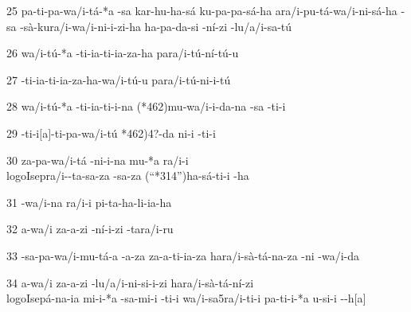 25 pa-ti-pa-wa/i-tá-*a  -sa kar-hu-ha-sá ku-pa-pa-sá-ha  a\logo{+}ra/i-pu-tá-wa/i-ni-sá-ha -sa -sà-ku\logo{+}ra/i-wa/i-ni-i-zi-ha ha\lbreak{}-pa-da-si -ní-zi \lmasc{}-lu/a/i-sa-tú

26 wa/i-tú-*a \lmasc{}-ti-ia-ti-ia-za-ha \lmasc{}pa\logo{+}ra/i-tú-ní-tú-u

27 -ti-ia-ti-ia-za-ha-wa/i-tú-u \lmasc{} pa\logo{+}ra/i-tú-ni-i-tú

28 wa/i-tú-*a \lmasc{}-ti-ia-ti-i-na \lmasc{}(*462)mu-wa/i-i-da-na -sa \lmasc{}-ti-i

29 -ti-i$[$a$]$-ti-pa-wa/i-tú *462)\lbreak{}4?-da \lmasc{}ni-i \lmasc{}-ti-i

30 \lmasc{}za-pa-wa/i-tá \lmasc{}-ni-i-na mu-*a \lmasc{}ra/i-i \\logo{I}sep{}ra/i--ta-sa-za \lmasc{}-sa-za \lmasc{}(“*314”)ha-sá-ti-i  \lmasc{}-ha

31 \lmasc{}-wa/i-na \lmasc{}ra/i-i pi-ta-ha-li-ia-ha

32 a-wa/i \lmasc{}za-a-zi \lmasc{}-ní-i-zi \lmasc{}-ta\logo{+}ra/i-ru

33 -sa-pa\lbreak{}-wa/i-mu-tá-a \lmasc{}-a-za za-a-ti-ia-za \lmasc{}ha\logo{+}ra/i-sà-tá-na-za -ni \lmasc{}-wa/i-da

34 a-wa/i \lmasc{}za-a-zi -lu/a/i-ni-si-i-zi ha\logo{+}ra/i-sà-tá-ní-zi \\logo{I}sep{}á-na-ia mi-i-*a \lmasc{}-sa-mi-i -ti-i \lmasc{}wa/i-sa5\logo{+}ra/i-ti-i pa-ti-i-*a \lmasc{}u-si-i --h$[$a$]$


